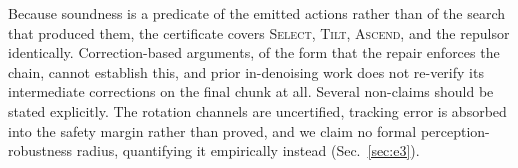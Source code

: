 Because soundness is a predicate of the emitted actions rather than of the
search that produced them, the certificate covers \textsc{Select},
\textsc{Tilt}, \textsc{Ascend}, and the repulsor identically. Correction-based
arguments, of the form that the repair enforces the chain, cannot establish
this, and prior in-denoising work does not re-verify its intermediate
corrections on the final chunk at all. Several non-claims should be stated
explicitly. The rotation channels are uncertified, tracking error is absorbed
into the safety margin rather than proved, and we claim no formal
perception-robustness radius, quantifying it empirically instead
(Sec.~\ref{sec:e3}).
